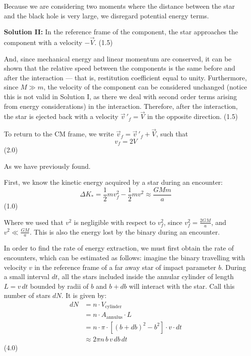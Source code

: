 \begin{description}
  Because we are considering two moments where the distance between the star
  and the black hole is very large, we disregard potential energy terms.

  \textbf{Solution II:}
  In the reference frame of the component, the star approaches the component
  with a velocity $-\vec{V}$. \hfill(1.5)

  And, since mechanical energy and linear momentum are conserved, it can be
  shown that the relative speed between the components is the same before and
  after the interaction --- that is, restitution coefficient equal to unity.
  Furthermore, since $M \gg m$, the velocity of the component can be
  considered unchanged (notice this is not valid in Solution I, as there we
  deal with second order terms arising from energy considerations) in the
  interaction. Therefore, after the interaction, the star is ejected back with
  a velocity $\vec{v}\,'_f = \vec{V}$ in the opposite direction. \hfill(1.5)

  To return to the CM frame, we write $\vec{v}_f = \vec{v}\,'_f + \vec{V}$,
  such that
  \[ v_f = 2V \]
  \hfill(2.0)

  As we have previously found.

\item[(c)] First, we know the kinetic energy acquired by a star during an
  encounter:
  \[ \Delta K_* = \frac{1}{2} m v_f^2 - \frac{1}{2} m v^2
     \approx \frac{GMm}{a} \]
  \hfill(1.0)

  Where we used that $v^2$ is negligible with respect to $v_f^2$, since
  $v_f^2 = \frac{2GM}{a}$, and $v^2 \ll \frac{GM}{a}$. This is also the
  energy lost by the binary during an encounter.

  In order to find the rate of energy extraction, we must first obtain the
  rate of encounters, which can be estimated as follows: imagine the binary
  travelling with velocity $v$ in the reference frame of a far away star of
  impact parameter $b$. During a small interval $dt$, all the stars included
  inside the annular cylinder of length $L = v\,dt$ bounded by radii of $b$
  and $b + db$ will interact with the star. Call this number of stars $dN$.
  It is given by:
  \begin{align*}
    dN &= n \cdot V_{\mathrm{cylinder}} \\
       &= n \cdot A_{\mathrm{annulus}} \cdot L \\
       &= n \cdot \pi \cdot \left[ (b + db)^2 - b^2 \right] \cdot v \cdot dt \\
       &\approx 2\pi n\, b\, v\, db\, dt
  \end{align*}
  \hfill(4.0)


\end{description}
